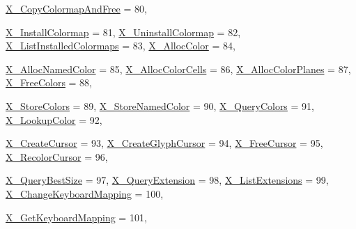 \begin{DoxyCompactItemize}
\hyperlink{namespace_tao_1_1_platform_1_1_x11_a2cfd0ff14439adb84809be96fb4c7d4b}{X\_\-CopyColormapAndFree} =  80, 
\par
\hyperlink{namespace_tao_1_1_platform_1_1_x11_a2cfd0ff14439adb84809be96fb4c7d4b}{X\_\-InstallColormap} =  81, 
\hyperlink{namespace_tao_1_1_platform_1_1_x11_a2cfd0ff14439adb84809be96fb4c7d4b}{X\_\-UninstallColormap} =  82, 
\hyperlink{namespace_tao_1_1_platform_1_1_x11_a2cfd0ff14439adb84809be96fb4c7d4b}{X\_\-ListInstalledColormaps} =  83, 
\hyperlink{namespace_tao_1_1_platform_1_1_x11_a2cfd0ff14439adb84809be96fb4c7d4b}{X\_\-AllocColor} =  84, 
\par
\hyperlink{namespace_tao_1_1_platform_1_1_x11_a2cfd0ff14439adb84809be96fb4c7d4b}{X\_\-AllocNamedColor} =  85, 
\hyperlink{namespace_tao_1_1_platform_1_1_x11_a2cfd0ff14439adb84809be96fb4c7d4b}{X\_\-AllocColorCells} =  86, 
\hyperlink{namespace_tao_1_1_platform_1_1_x11_a2cfd0ff14439adb84809be96fb4c7d4b}{X\_\-AllocColorPlanes} =  87, 
\hyperlink{namespace_tao_1_1_platform_1_1_x11_a2cfd0ff14439adb84809be96fb4c7d4b}{X\_\-FreeColors} =  88, 
\par
\hyperlink{namespace_tao_1_1_platform_1_1_x11_a2cfd0ff14439adb84809be96fb4c7d4b}{X\_\-StoreColors} =  89, 
\hyperlink{namespace_tao_1_1_platform_1_1_x11_a2cfd0ff14439adb84809be96fb4c7d4b}{X\_\-StoreNamedColor} =  90, 
\hyperlink{namespace_tao_1_1_platform_1_1_x11_a2cfd0ff14439adb84809be96fb4c7d4b}{X\_\-QueryColors} =  91, 
\hyperlink{namespace_tao_1_1_platform_1_1_x11_a2cfd0ff14439adb84809be96fb4c7d4b}{X\_\-LookupColor} =  92, 
\par
\hyperlink{namespace_tao_1_1_platform_1_1_x11_a2cfd0ff14439adb84809be96fb4c7d4b}{X\_\-CreateCursor} =  93, 
\hyperlink{namespace_tao_1_1_platform_1_1_x11_a2cfd0ff14439adb84809be96fb4c7d4b}{X\_\-CreateGlyphCursor} =  94, 
\hyperlink{namespace_tao_1_1_platform_1_1_x11_a2cfd0ff14439adb84809be96fb4c7d4b}{X\_\-FreeCursor} =  95, 
\hyperlink{namespace_tao_1_1_platform_1_1_x11_a2cfd0ff14439adb84809be96fb4c7d4b}{X\_\-RecolorCursor} =  96, 
\par
\hyperlink{namespace_tao_1_1_platform_1_1_x11_a2cfd0ff14439adb84809be96fb4c7d4b}{X\_\-QueryBestSize} =  97, 
\hyperlink{namespace_tao_1_1_platform_1_1_x11_a2cfd0ff14439adb84809be96fb4c7d4b}{X\_\-QueryExtension} =  98, 
\hyperlink{namespace_tao_1_1_platform_1_1_x11_a2cfd0ff14439adb84809be96fb4c7d4b}{X\_\-ListExtensions} =  99, 
\hyperlink{namespace_tao_1_1_platform_1_1_x11_a2cfd0ff14439adb84809be96fb4c7d4b}{X\_\-ChangeKeyboardMapping} =  100, 
\par
\hyperlink{namespace_tao_1_1_platform_1_1_x11_a2cfd0ff14439adb84809be96fb4c7d4b}{X\_\-GetKeyboardMapping} =  101, 

\end{DoxyCompactItemize}
